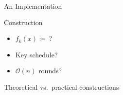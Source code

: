 \begin{frame}{An Implementation}
{\begin{minipage}{0.40\textwidth}
    \end{minipage}
    \hfill
    \begin{minipage}{0.56\textwidth}
        \centering
        \begin{block}{Construction}
            \begin{itemize}
                \item $f_k(x) \coloneqq\ $?
                \item Key schedule?
                \item $\mathcal{O}(n)$ rounds?
            \end{itemize}
        \end{block}
        \vspace{5pt}
        Theoretical vs.\ practical constructions
    \end{minipage}
    }
\end{frame}


